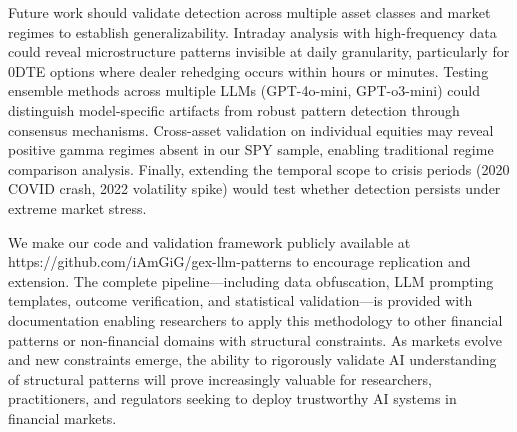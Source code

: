 Future work should validate detection across multiple asset classes and market regimes to establish generalizability. Intraday analysis with high-frequency data could reveal microstructure patterns invisible at daily granularity, particularly for 0DTE options where dealer rehedging occurs within hours or minutes. Testing ensemble methods across multiple LLMs (GPT-4o-mini, GPT-o3-mini) could distinguish model-specific artifacts from robust pattern detection through consensus mechanisms. Cross-asset validation on individual equities may reveal positive gamma regimes absent in our SPY sample, enabling traditional regime comparison analysis. Finally, extending the temporal scope to crisis periods (2020 COVID crash, 2022 volatility spike) would test whether detection persists under extreme market stress.

We make our code and validation framework publicly available at https://github.com/iAmGiG/gex-llm-patterns to encourage replication and extension. The complete pipeline—including data obfuscation, LLM prompting templates, outcome verification, and statistical validation—is provided with documentation enabling researchers to apply this methodology to other financial patterns or non-financial domains with structural constraints. As markets evolve and new constraints emerge, the ability to rigorously validate AI understanding of structural patterns will prove increasingly valuable for researchers, practitioners, and regulators seeking to deploy trustworthy AI systems in financial markets.